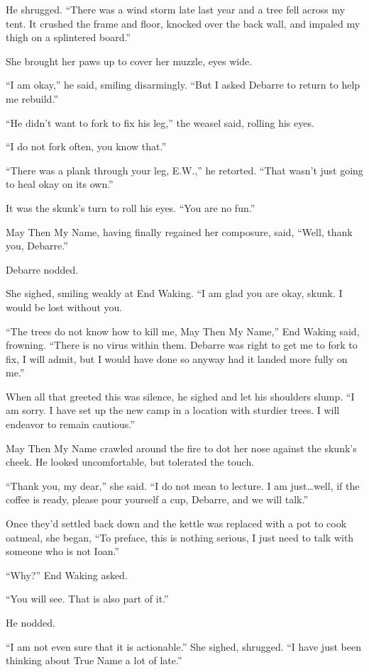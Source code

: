 He shrugged. ``There was a wind storm late last year and a tree fell across my tent. It crushed the frame and floor, knocked over the back wall, and impaled my thigh on a splintered board.''

She brought her paws up to cover her muzzle, eyes wide.

``I am okay,'' he said, smiling disarmingly. ``But I asked Debarre to return to help me rebuild.''

``He didn't want to fork to fix his leg,'' the weasel said, rolling his eyes.

``I do not fork often, you know that.''

``There was a plank through your leg, E.W.,'' he retorted. ``That wasn't just going to heal okay on its own.''

It was the skunk's turn to roll his eyes. ``You are no fun.''

May Then My Name, having finally regained her composure, said, ``Well, thank you, Debarre.''

Debarre nodded.

She sighed, smiling weakly at End Waking. ``I am glad you are okay, skunk. I would be lost without you.

``The trees do not know how to kill me, May Then My Name,'' End Waking said, frowning. ``There is no virus within them. Debarre was right to get me to fork to fix, I will admit, but I would have done so anyway had it landed more fully on me.''

When all that greeted this was silence, he sighed and let his shoulders slump. ``I am sorry. I have set up the new camp in a location with sturdier trees. I will endeavor to remain cautious.''

May Then My Name crawled around the fire to dot her nose against the skunk's cheek. He looked uncomfortable, but tolerated the touch.

``Thank you, my dear,'' she said. ``I do not mean to lecture. I am just\ldots well, if the coffee is ready, please pour yourself a cup, Debarre, and we will talk.''

Once they'd settled back down and the kettle was replaced with a pot to cook oatmeal, she began, ``To preface, this is nothing serious, I just need to talk with someone who is not Ioan.''

``Why?'' End Waking asked.

``You will see. That is also part of it.''

He nodded.

``I am not even sure that it is actionable.'' She sighed, shrugged. ``I have just been thinking about True Name a lot of late.''

